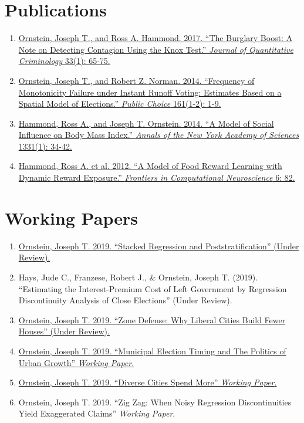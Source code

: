 \documentclass[letterpaper]{article}
\begin{document}
\hrulefill

\section*{Publications}
\begin{enumerate}
\item \href{https://joeornstein.github.io/papers/Ornstein-Hammond2017.pdf}{Ornstein, Joseph T., and Ross A. Hammond. 2017. ``The Burglary Boost: A Note on Detecting Contagion Using the Knox Test.'' \textit{Journal of Quantitative Criminology} 33(1): 65-75.}
\item \href{https://joeornstein.github.io/MonotonicityFailure.html}{Ornstein, Joseph T., and Robert Z. Norman. 2014. ``Frequency of Monotonicity Failure under Instant Runoff Voting: Estimates Based on a Spatial Model of Elections.'' \textit{Public Choice} 161(1-2): 1-9.}
\item \href{https://joeornstein.github.io/papers/Hammond_et_al-2014-Annals_of_the_New_York_Academy_of_Sciences.pdf}{Hammond, Ross A., and Joseph T. Ornstein. 2014. ``A Model of Social Influence on Body Mass Index.'' \textit{Annals of the New York Academy of Sciences} 1331(1): 34-42.}
\item \href{https://joeornstein.github.io/papers/Hammond-2012.pdf}{Hammond, Ross A. et al. 2012. ``A Model of Food Reward Learning with Dynamic Reward Exposure.'' \textit{Frontiers in Computational Neuroscience} 6: 82.}
\end{enumerate}

\hrulefill
\section*{Working Papers}
\begin{enumerate}
\item \href{https://joeornstein.github.io/papers/MLP.pdf}{Ornstein, Joseph T. 2019. ``Stacked Regression and Poststratification'' (Under Review).} 
\item Hays, Jude C., Franzese, Robert J., \& Ornstein, Joseph T. (2019). ``Estimating the Interest-Premium Cost of Left Government by Regression Discontinuity Analysis of Close Elections'' (Under Review).
\item \href{https://joeornstein.github.io/papers/ornstein-zone-defense.pdf}{Ornstein, Joseph T. 2019. ``Zone Defense: Why Liberal Cities Build Fewer Houses'' (Under Review).}
\item \href{https://joeornstein.github.io/ElectionTiming.html}{Ornstein, Joseph T. 2019. ``Municipal Election Timing and The Politics of Urban Growth'' \textit{Working Paper}.}
\item \href{https://joeornstein.github.io/papers/dcsm.pdf}{Ornstein, Joseph T. 2019. ``Diverse Cities Spend More'' \textit{Working Paper}.}
\item Ornstein, Joseph T. 2019. ``Zig Zag: When Noisy Regression Discontinuities Yield Exaggerated Claims'' \textit{Working Paper}.
\end{enumerate}
\end{document}
